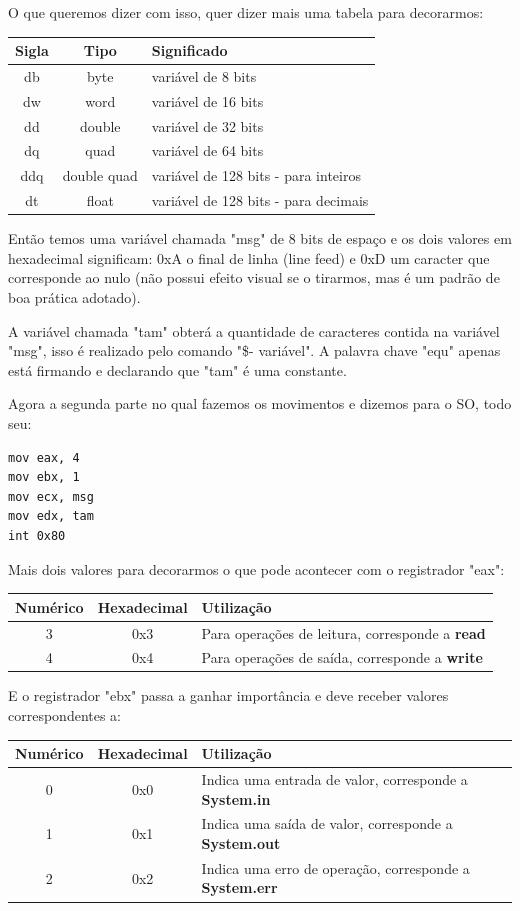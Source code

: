 O que queremos dizer com isso, quer dizer mais uma tabela para decorarmos:
\begin{table}[H]
	\centering 
	\begin{tabular}{c | c | l }
		\textbf{Sigla} & \textbf{Tipo} & \textbf{Significado} \\ \hline
		db & byte & variável de 8 bits \\
		dw & word & variável de 16 bits \\
		dd & double & variável de 32 bits \\
		dq & quad & variável de 64 bits \\
		ddq & double quad & variável de 128 bits - para inteiros \\
		dt & float & variável de 128 bits - para decimais
	\end{tabular}
\end{table}

Então temos uma variável chamada "msg" de 8 bits de espaço e os dois valores em hexadecimal significam: 0xA o final de linha (line feed) e 0xD um caracter que corresponde ao nulo (não possui efeito visual se o tirarmos, mas é um padrão de boa prática adotado).

A variável chamada "tam" obterá a quantidade de caracteres contida na variável "msg", isso é realizado pelo comando "\$- variável". A palavra chave "equ" apenas está firmando e declarando que "tam" é uma constante.

Agora a segunda parte no qual fazemos os movimentos e dizemos para o SO, todo seu:
\begin{lstlisting}[]
mov eax, 4
mov ebx, 1
mov ecx, msg
mov edx, tam
int 0x80
\end{lstlisting}

Mais dois valores para decorarmos o que pode acontecer com o registrador "eax":
\begin{table}[H]
	\centering 
	\begin{tabular}{c | c | l }
		\textbf{Numérico} & \textbf{Hexadecimal} & \textbf{Utilização} \\ \hline
		3 & 0x3 & Para operações de leitura, corresponde a \textbf{read} \\
		4 & 0x4 & Para operações de saída, corresponde a \textbf{write}
	\end{tabular}
\end{table}

E o registrador "ebx" passa a ganhar importância e deve receber valores correspondentes a:
\begin{table}[H]
	\centering 
	\begin{tabular}{c | c | l }
		\textbf{Numérico} & \textbf{Hexadecimal} & \textbf{Utilização} \\ \hline
		0 & 0x0 & Indica uma entrada de valor, corresponde a \textbf{System.in} \\
		1 & 0x1 & Indica uma saída de valor, corresponde a \textbf{System.out} \\
		2 & 0x2 & Indica uma erro de operação, corresponde a \textbf{System.err}
	\end{tabular}
\end{table}

